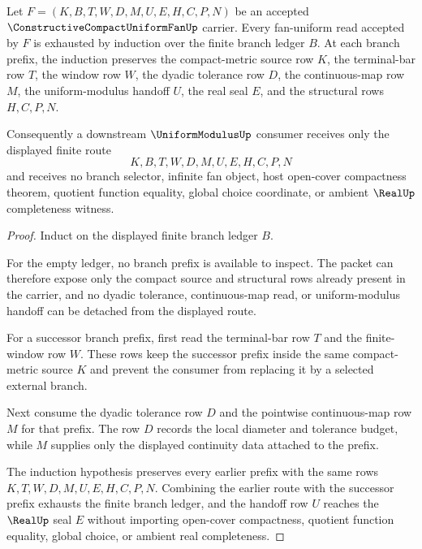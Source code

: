 \begin{theorem}
\label{thm:constructive-compact-uniform-fan-finite-branch-induction}
Let $F=(K,B,T,W,D,M,U,E,H,C,P,N)$ be an accepted $\ConstructiveCompactUniformFanUp$ carrier. Every fan-uniform read accepted by $F$ is exhausted by induction over the finite branch ledger $B$. At each branch prefix, the induction preserves the compact-metric source row $K$, the terminal-bar row $T$, the window row $W$, the dyadic tolerance row $D$, the continuous-map row $M$, the uniform-modulus handoff $U$, the real seal $E$, and the structural rows $H,C,P,N$.

Consequently a downstream $\UniformModulusUp$ consumer receives only the displayed finite route
$$
K,B,T,W,D,M,U,E,H,C,P,N
$$
and receives no branch selector, infinite fan object, host open-cover compactness theorem, quotient function equality, global choice coordinate, or ambient $\RealUp$ completeness witness.
\end{theorem}
\begin{proof}
Induct on the displayed finite branch ledger $B$.

For the empty ledger, no branch prefix is available to inspect. The packet can therefore expose only the compact source and structural rows already present in the carrier, and no dyadic tolerance, continuous-map read, or uniform-modulus handoff can be detached from the displayed route.

For a successor branch prefix, first read the terminal-bar row $T$ and the finite-window row $W$. These rows keep the successor prefix inside the same compact-metric source $K$ and prevent the consumer from replacing it by a selected external branch.

Next consume the dyadic tolerance row $D$ and the pointwise continuous-map row $M$ for that prefix. The row $D$ records the local diameter and tolerance budget, while $M$ supplies only the displayed continuity data attached to the prefix.

The induction hypothesis preserves every earlier prefix with the same rows $K,T,W,D,M,U,E,H,C,P,N$. Combining the earlier route with the successor prefix exhausts the finite branch ledger, and the handoff row $U$ reaches the $\RealUp$ seal $E$ without importing open-cover compactness, quotient function equality, global choice, or ambient real completeness.
\end{proof}


